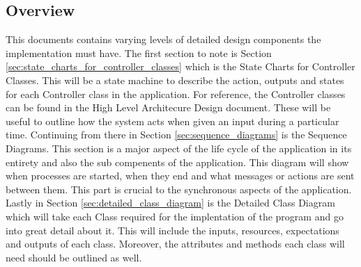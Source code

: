 \documentclass[]{article}
\begin{document}
\subsection{Overview}
\label{sub:overview}

This documents contains varying levels of detailed design components the implementation must have. The first section to note is Section \ref{sec:state_charts_for_controller_classes} which is the State Charts for Controller Classes. This will be a state machine to describe the action, outputs and states for each Controller class in the application. For reference, the Controller classes can be found in the High Level Architecure Design document. These will be useful to outline how the system acts when given an input during a particular time. Continuing from there in Section \ref{sec:sequence_diagrams} is the Sequence Diagrams. This section is a major aspect of the life cycle of the application in its entirety and also the sub compenents of the application. This diagram will show when processes are started, when they end and what messages or actions are sent between them. This part is crucial to the synchronous aspects of the application. Lastly in Section \ref{sec:detailed_class_diagram} is the Detailed Class Diagram which will take each Class required for the implentation of the program and go into great detail about it. This will include the inputs, resources, expectations and outputs of each class. Moreover, the attributes and methods each class will need should be outlined as well.
\end{document}
